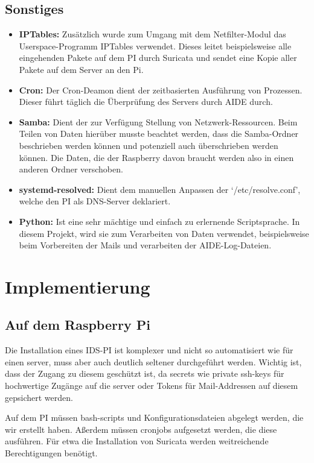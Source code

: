 \documentclass{article}
\begin{document}
\subsection{Sonstiges}
\begin{itemize}
    \item \textbf{IPTables:} Zusätzlich wurde zum Umgang mit dem Netfilter-Modul das Userspace-Programm IPTables verwendet. Dieses leitet beispielsweise alle eingehenden Pakete auf dem PI durch Suricata und sendet eine Kopie aller Pakete auf dem Server an den Pi.
    \item \textbf{Cron:} Der Cron-Deamon dient der zeitbasierten Ausführung von Prozessen. Dieser führt täglich die Überprüfung des Servers durch AIDE durch.
    \item \textbf{Samba:} Dient der zur Verfügung Stellung von Netzwerk-Ressourcen. Beim Teilen von Daten hierüber musste beachtet werden, dass die Samba-Ordner beschrieben werden können und potenziell auch überschrieben werden können. Die Daten, die der Raspberry davon braucht werden also in einen anderen Ordner verschoben.
    \item \textbf{systemd-resolved:} Dient dem manuellen Anpassen der `/etc/resolve.conf', welche den PI als DNS-Server deklariert.
    \item \textbf{Python:} Ist eine sehr mächtige und einfach zu erlernende Scriptsprache. In diesem Projekt, wird sie zum Verarbeiten von Daten verwendet, beispielsweise beim Vorbereiten der Mails und verarbeiten der AIDE-Log-Dateien.
\end{itemize}

\section{Implementierung}

\subsection{Auf dem Raspberry Pi}
Die Installation eines IDS-PI ist komplexer und nicht so automatisiert wie für einen server, muss aber auch deutlich seltener durchgeführt werden. Wichtig ist, dass der Zugang zu diesem geschützt ist, da secrets wie private ssh-keys für hochwertige Zugänge auf die server oder Tokens für Mail-Addressen auf diesem gepsichert werden.

Auf dem PI müssen bash-scripts und Konfigurationsdateien abgelegt werden, die wir erstellt haben. Aßerdem müssen cronjobs aufgesetzt werden, die diese ausführen. Für etwa die Installation von Suricata werden weitreichende Berechtigungen benötigt.
\end{document}
